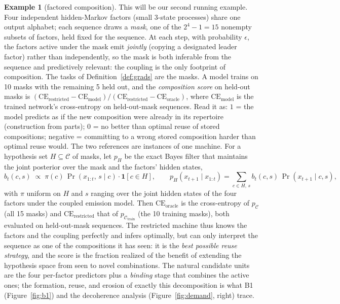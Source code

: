 \documentclass[10pt]{article}
\theoremstyle{definition}
\newtheorem{example}{Example}
\begin{document}
\begin{example}[factored composition]\label{ex:comp}
This will be our second running example. Four independent hidden-Markov factors (small 3-state processes) share one output alphabet; each sequence draws a \emph{mask}, one of the $2^4 - 1 = 15$ nonempty subsets of factors, held fixed for the sequence. At each step, with probability $\epsilon$, the factors active under the mask emit \emph{jointly} (copying a designated leader factor) rather than independently, so the mask is both inferable from the sequence and predictively relevant: the coupling is the only footprint of composition. The tasks of Definition~\ref{def:grads} are the masks. A model trains on 10 masks with the remaining 5 held out, and the \emph{composition score} on held-out masks is $(\mathrm{CE}_{\text{restricted}} - \mathrm{CE}_{\text{model}})/(\mathrm{CE}_{\text{restricted}} - \mathrm{CE}_{\text{oracle}})$, where $\mathrm{CE}_{\text{model}}$ is the trained network's cross-entropy on held-out-mask sequences. Read it as: $1$ = the model predicts as if the new composition were already in its repertoire (construction from parts); $0$ = no better than optimal reuse of stored compositions; negative = committing to a wrong stored composition harder than optimal reuse would. The two references are instances of one machine. For a hypothesis set $H \subseteq \mathcal{C}$ of masks, let $p_H$ be the exact Bayes filter that maintains the joint posterior over the mask and the factors' hidden states,
$$b_t(c, s) \;\propto\; \pi(c)\, \Pr\!\left(x_{1:t},\, s \mid c\right) \cdot \mathbf{1}[c \in H], \qquad p_H(x_{t+1} \mid x_{1:t}) = \sum_{c \in H,\, s} b_t(c, s)\, \Pr(x_{t+1} \mid c, s),$$
with $\pi$ uniform on $H$ and $s$ ranging over the joint hidden states of the four factors under the coupled emission model. Then $\mathrm{CE}_{\text{oracle}}$ is the cross-entropy of $p_{\mathcal{C}}$ (all 15 masks) and $\mathrm{CE}_{\text{restricted}}$ that of $p_{\mathcal{C}_{\text{train}}}$ (the 10 training masks), both evaluated on held-out-mask sequences. The restricted machine thus knows the factors and the coupling perfectly and infers optimally, but can only interpret the sequence as one of the compositions it has seen: it is the \emph{best possible reuse strategy}, and the score is the fraction realized of the benefit of extending the hypothesis space from seen to novel combinations. The natural candidate units are the four per-factor predictors plus a \emph{binding} stage that combines the active ones; the formation, reuse, and erosion of exactly this decomposition is what B1 (Figure~\ref{fig:b1}) and the decoherence analysis (Figure~\ref{fig:demand}, right) trace.
\end{example}
\end{document}

